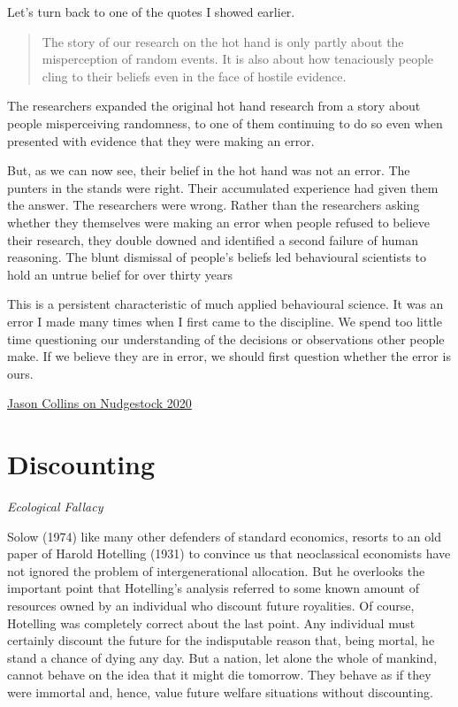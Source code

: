 \documentclass[
]{book}
\begin{document}
Let's turn back to one of the quotes I showed earlier.

\begin{quote}
The story of our research on the hot hand is only partly about the misperception of random events. It is also about how tenaciously people cling to their beliefs even in the face of hostile evidence.
\end{quote}

The researchers expanded the original hot hand research from a story about people misperceiving randomness, to one of them continuing to do so even when presented with evidence that they were making an error.

But, as we can now see, their belief in the hot hand was not an error. The punters in the stands were right. Their accumulated experience had given them the answer. The researchers were wrong. Rather than the researchers asking whether they themselves were making an error when people refused to believe their research, they double downed and identified a second failure of human reasoning. The blunt dismissal of people's beliefs led behavioural scientists to hold an untrue belief for over thirty years

This is a persistent characteristic of much applied behavioural science. It was an error I made many times when I first came to the discipline. We spend too little time questioning our understanding of the decisions or observations other people make. If we believe they are in error, we should first question whether the error is ours.

\href{https://jasoncollins.blog/2020/06/12/arent-we-smart-fellow-behavioural-scientists/}{Jason Collins on Nudgestock 2020}

\hypertarget{discounting}{%
\chapter{Discounting}\label{discounting}}

\emph{Ecological Fallacy}

Solow (1974) like many other defenders of standard economics,
resorts to an old paper of Harold Hotelling (1931) to convince us that
neoclassical economists have not ignored the problem of intergenerational allocation.
But he overlooks the important point that Hotelling's analysis referred to
some known amount of resources owned by an individual who discount future royalities.
Of course, Hotelling was completely correct about the last point.
Any individual must certainly discount the future for the indisputable reason that,
being mortal, he stand a chance of dying any day.
But a nation, let alone the whole of mankind, cannot behave on the idea that
it might die tomorrow.
They behave as if they were immortal and, hence,
value future welfare situations without discounting.
\end{document}
